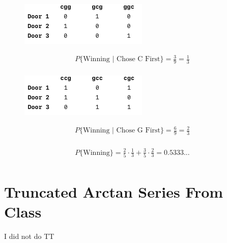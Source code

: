 \documentclass{article}
\begin{document}
\vspace{15pt}
\begin{multicols}{2}
\begin{figure}[H]
	\centering
	\includegraphics[width=0.75\linewidth]{../drawings/p3_2}
\end{figure}
\vspace{-25pt}
\begin{align*}
P\{\text{Winning | Chose C First}\} = \frac{3}{9} = \frac{1}{3}\\
\end{align*}



\columnbreak
\begin{figure}[H]
	\centering
	\includegraphics[width=0.75\linewidth]{../drawings/p3_3}
\end{figure}
\vspace{-25pt}
\begin{align*}
P\{\text{Winning | Chose G First}\} = \frac{6}{9} = \frac{2}{3} \\
\end{align*}

\end{multicols}

\begin{align*}
	P\{\text{Winning}\} = \frac{2}{5}  \cdot \frac{1}{3} + \frac{3}{5}  \cdot \frac{2}{3} = 0.5333...\\
\end{align*}

\section{Truncated Arctan Series From Class}
I did not do TT
\end{document}
